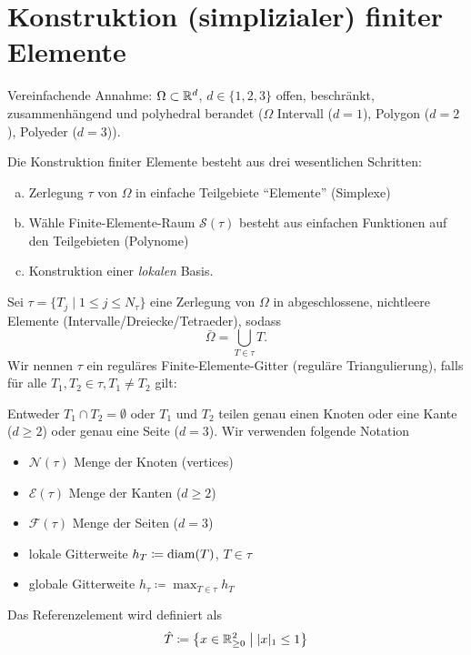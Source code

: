 \documentclass[../skript.tex]{subfiles}
\begin{document}
\section{Konstruktion (simplizialer) finiter Elemente} %
\label{sec:c2e3}
Vereinfachende Annahme: $\Omega \subset \mathbb{R}^d$, $d \in \{ 1, 2, 3 \}$ offen, beschränkt, zusammenhängend und polyhedral berandet ($\Omega$ Intervall ($d = 1$), Polygon ($d = 2$), Polyeder ($d = 3$)).

Die Konstruktion finiter Elemente besteht aus drei wesentlichen Schritten:
\begin{enumerate}[(a)]
\item Zerlegung $\tau$ von $\Omega$ in einfache Teilgebiete ``Elemente'' (Simplexe)
\item Wähle Finite-Elemente-Raum $\mathcal{S}(\tau)$ besteht aus einfachen Funktionen auf den Teilgebieten (Polynome)
\item Konstruktion einer \emph{lokalen} Basis.
\end{enumerate}
\begin{definition} %
\label{def:c2e3s1}
Sei $\tau = \{ T_j \mid 1 \leq j \leq N_\tau \}$ eine Zerlegung von $\Omega$ in abgeschlossene, nichtleere Elemente (Intervalle\slash{}Dreiecke\slash{}Tetraeder), sodass
\[
	\bar{\Omega} = \bigcup_{T \in \tau} T.
\]
Wir nennen $\tau$ ein reguläres Finite-Elemente-Gitter (reguläre Triangulierung), falls für alle $T_1, T_2 \in \tau, T_1 \ne T_2$ gilt:

Entweder $T_1 \cap T_2 = \emptyset$ oder $T_1$ und $T_2$ teilen genau einen Knoten oder eine Kante ($d \geq 2$) oder genau eine Seite ($d = 3$).
Wir verwenden folgende Notation
\begin{itemize}
\item $\mathcal{N}(\tau)$ Menge der Knoten (vertices)
\item $\mathcal{E}(\tau)$ Menge der Kanten ($d \geq 2$)
\item $\mathcal{F}(\tau)$ Menge der Seiten ($d = 3$)
\item lokale Gitterweite $h_T \coloneqq \operatorname*{diam}(T)$, $T \in \tau$
\item globale Gitterweite $h_\tau \coloneqq \max_{T \in \tau} h_T$
\end{itemize}
\end{definition}
\begin{definition}[Referenzelement] %
\label{def:c2e3s2}
Das Referenzelement wird definiert als
\[
	\hat{T} \coloneqq \left\{ x \in \mathbb{R}_{\geq 0}^2 \mathrel{}\middle|\mathrel{} |x|_1 \leq 1 \right\}
\]
\end{definition}
\end{document}
